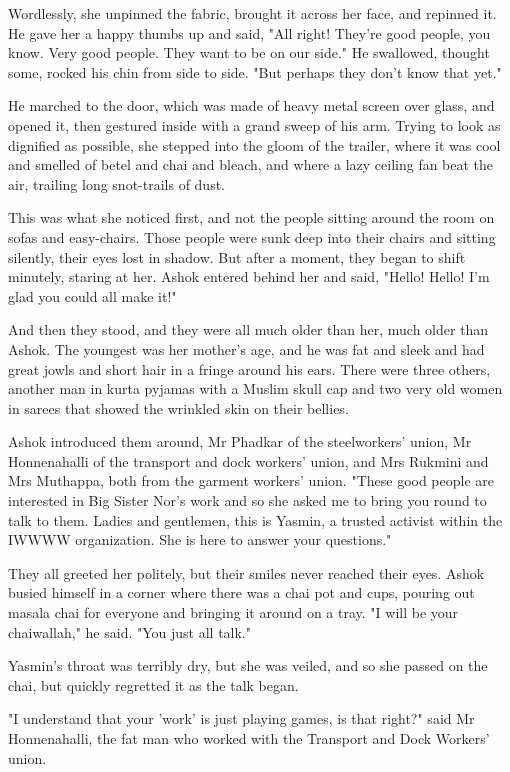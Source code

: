 Wordlessly, she unpinned the fabric, brought it across her face,
and repinned it. He gave her a happy thumbs up and said, "All
right! They're good people, you know. Very good people. They want
to be on our side." He swallowed, thought some, rocked his chin
from side to side. "But perhaps they don't know that yet."

He marched to the door, which was made of heavy metal screen over
glass, and opened it, then gestured inside with a grand sweep of
his arm. Trying to look as dignified as possible, she stepped into
the gloom of the trailer, where it was cool and smelled of betel
and chai and bleach, and where a lazy ceiling fan beat the air,
trailing long snot-trails of dust.

This was what she noticed first, and not the people sitting around
the room on sofas and easy-chairs. Those people were sunk deep into
their chairs and sitting silently, their eyes lost in shadow. But
after a moment, they began to shift minutely, staring at her. Ashok
entered behind her and said, "Hello! Hello! I'm glad you could all
make it!"

And then they stood, and they were all much older than her, much
older than Ashok. The youngest was her mother's age, and he was fat
and sleek and had great jowls and short hair in a fringe around his
ears. There were three others, another man in kurta pyjamas with a
Muslim skull cap and two very old women in sarees that showed the
wrinkled skin on their bellies.

Ashok introduced them around, Mr Phadkar of the steelworkers'
union, Mr Honnenahalli of the transport and dock workers' union,
and Mrs Rukmini and Mrs Muthappa, both from the garment workers'
union. "These good people are interested in Big Sister Nor's work
and so she asked me to bring you round to talk to them. Ladies and
gentlemen, this is Yasmin, a trusted activist within the IWWWW
organization. She is here to answer your questions."

They all greeted her politely, but their smiles never reached their
eyes. Ashok busied himself in a corner where there was a chai pot
and cups, pouring out masala chai for everyone and bringing it
around on a tray. "I will be your chaiwallah," he said. "You just
all talk."

Yasmin's throat was terribly dry, but she was veiled, and so she
passed on the chai, but quickly regretted it as the talk began.

"I understand that your 'work' is just playing games, is that
right?" said Mr Honnenahalli, the fat man who worked with the
Transport and Dock Workers' union.

